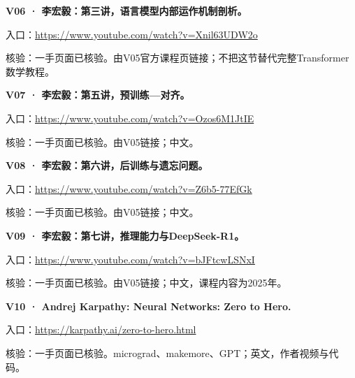 \par\noindent\begin{minipage}{\linewidth}
\textbf{V06 · 李宏毅：第三讲，语言模型内部运作机制剖析。}

入口：\url{https://www.youtube.com/watch?v=Xnil63UDW2o}

核验：一手页面已核验。由V05官方课程页链接；不把这节替代完整Transformer数学教程。
\end{minipage}\par\vspace{6pt}

\par\noindent\begin{minipage}{\linewidth}
\textbf{V07 · 李宏毅：第五讲，预训练---对齐。}

入口：\url{https://www.youtube.com/watch?v=Ozos6M1JtIE}

核验：一手页面已核验。由V05链接；中文。
\end{minipage}\par\vspace{6pt}

\par\noindent\begin{minipage}{\linewidth}
\textbf{V08 · 李宏毅：第六讲，后训练与遗忘问题。}

入口：\url{https://www.youtube.com/watch?v=Z6b5-77EfGk}

核验：一手页面已核验。由V05链接；中文。
\end{minipage}\par\vspace{6pt}

\par\noindent\begin{minipage}{\linewidth}
\textbf{V09 · 李宏毅：第七讲，推理能力与DeepSeek-R1。}

入口：\url{https://www.youtube.com/watch?v=bJFtcwLSNxI}

核验：一手页面已核验。由V05链接；中文，课程内容为2025年。
\end{minipage}\par\vspace{6pt}

\par\noindent\begin{minipage}{\linewidth}
\textbf{V10 · Andrej Karpathy: Neural Networks: Zero to Hero.}

入口：\url{https://karpathy.ai/zero-to-hero.html}

核验：一手页面已核验。micrograd、makemore、GPT；英文，作者视频与代码。
\end{minipage}\par\vspace{6pt}

